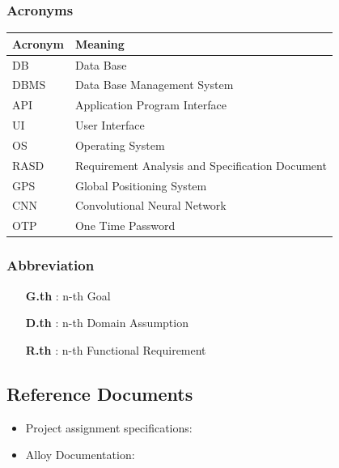 \subsubsection{Acronyms}
\begin{tabular}{|l|l|}
\hline
Acronym & Meaning \\ \hline
DB & Data Base \\ \hline
DBMS & Data Base Management System \\ \hline
API & Application Program Interface \\ \hline
UI & User Interface \\ \hline
OS & Operating System \\ \hline
RASD & Requirement Analysis and Specification Document \\ \hline
GPS & Global Positioning System \\ \hline
CNN & Convolutional Neural Network \\ \hline
OTP & One Time Password \\ 
\hline
\end{tabular}

\subsubsection{Abbreviation}

\begin{itemize}

\item [\textbf{G.th}]: n-th Goal

\item [\textbf{D.th}]: n-th Domain Assumption

\item [\textbf{R.th}]: n-th Functional Requirement

\end{itemize}

\subsection{Reference Documents}

\begin{itemize}

\item Project assignment specifications:\cite{assignment.pdf}

\item Alloy Documentation:\cite{http://alloy.lcs.mit.edu/alloy/documentation.html}

\end{itemize}

